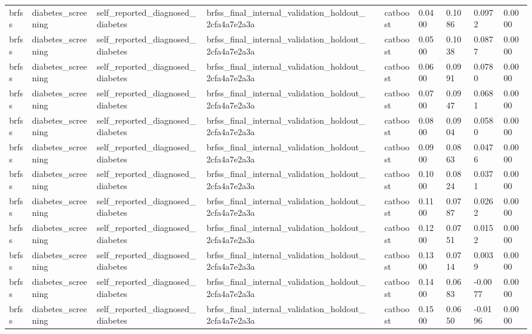 \begin{tabular}{llllllllll}
brfss & diabetes\_screening & self\_reported\_diagnosed\_diabetes & brfss\_final\_internal\_validation\_holdout\_2cfa4a7e2a3a &  & catboost & 0.0400 & 0.1086 & 0.0972 & 0.0000 \\
brfss & diabetes\_screening & self\_reported\_diagnosed\_diabetes & brfss\_final\_internal\_validation\_holdout\_2cfa4a7e2a3a &  & catboost & 0.0500 & 0.1038 & 0.0877 & 0.0000 \\
brfss & diabetes\_screening & self\_reported\_diagnosed\_diabetes & brfss\_final\_internal\_validation\_holdout\_2cfa4a7e2a3a &  & catboost & 0.0600 & 0.0991 & 0.0780 & 0.0000 \\
brfss & diabetes\_screening & self\_reported\_diagnosed\_diabetes & brfss\_final\_internal\_validation\_holdout\_2cfa4a7e2a3a &  & catboost & 0.0700 & 0.0947 & 0.0681 & 0.0000 \\
brfss & diabetes\_screening & self\_reported\_diagnosed\_diabetes & brfss\_final\_internal\_validation\_holdout\_2cfa4a7e2a3a &  & catboost & 0.0800 & 0.0904 & 0.0580 & 0.0000 \\
brfss & diabetes\_screening & self\_reported\_diagnosed\_diabetes & brfss\_final\_internal\_validation\_holdout\_2cfa4a7e2a3a &  & catboost & 0.0900 & 0.0863 & 0.0476 & 0.0000 \\
brfss & diabetes\_screening & self\_reported\_diagnosed\_diabetes & brfss\_final\_internal\_validation\_holdout\_2cfa4a7e2a3a &  & catboost & 0.1000 & 0.0824 & 0.0371 & 0.0000 \\
brfss & diabetes\_screening & self\_reported\_diagnosed\_diabetes & brfss\_final\_internal\_validation\_holdout\_2cfa4a7e2a3a &  & catboost & 0.1100 & 0.0787 & 0.0262 & 0.0000 \\
brfss & diabetes\_screening & self\_reported\_diagnosed\_diabetes & brfss\_final\_internal\_validation\_holdout\_2cfa4a7e2a3a &  & catboost & 0.1200 & 0.0751 & 0.0152 & 0.0000 \\
brfss & diabetes\_screening & self\_reported\_diagnosed\_diabetes & brfss\_final\_internal\_validation\_holdout\_2cfa4a7e2a3a &  & catboost & 0.1300 & 0.0714 & 0.0039 & 0.0000 \\
brfss & diabetes\_screening & self\_reported\_diagnosed\_diabetes & brfss\_final\_internal\_validation\_holdout\_2cfa4a7e2a3a &  & catboost & 0.1400 & 0.0683 & -0.0077 & 0.0000 \\
brfss & diabetes\_screening & self\_reported\_diagnosed\_diabetes & brfss\_final\_internal\_validation\_holdout\_2cfa4a7e2a3a &  & catboost & 0.1500 & 0.0650 & -0.0196 & 0.0000 \\

\end{tabular}

